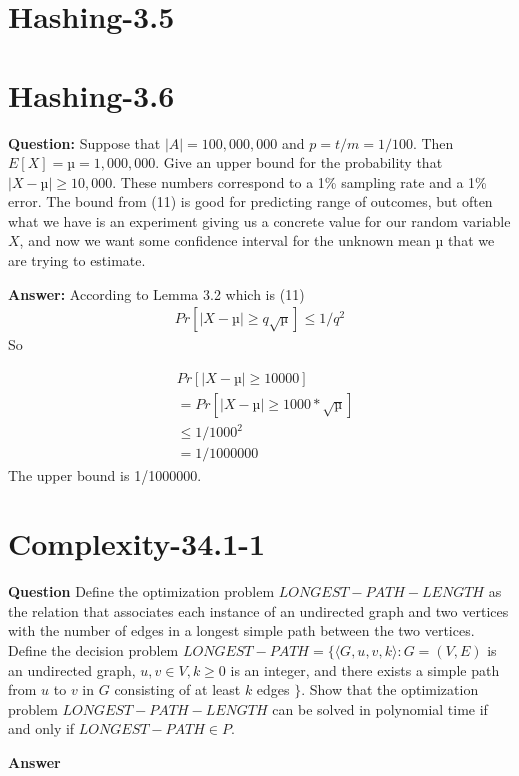 \documentclass[12pt]{article}
\begin{document}
\section{Hashing-3.5}

\section{Hashing-3.6}
\textbf{Question:}
Suppose that $|A| = 100,000,000$ and $p = t/m = 1/100$. Then $E[X] = µ = 1,000,000$. Give an upper bound for the probability that $|X - µ| \geq 10,000$. These numbers correspond to a 1\% sampling rate and a 1\% error. 
The bound from (11) is good for predicting range of outcomes, but often what we have is an experiment giving us a concrete value for our random variable $X$, and now we want some confidence interval for the unknown mean $µ$ that we are trying to estimate.

\textbf{Answer:}
According to Lemma 3.2 which is (11)
\begin{align}
    Pr[|X - µ| \geq q\sqrt{µ}] \leq 1 / q^2
\end{align}
So 

\begin{equation}
\begin{aligned}
    &Pr[|X - µ| \geq 10000]\\
    &=  Pr[|X - µ| \geq 1000 *\sqrt{µ}]\\
    & \leq 1/1000^2\\
    &= 1/1000000
\end{aligned}
\end{equation}
The upper bound is 1/1000000.

\section{Complexity-34.1-1}
\textbf{Question}
Define the optimization problem $LONGEST-PATH-LENGTH$ as the relation that associates each instance of an undirected graph and two vertices with the number of edges in a longest simple path between the two vertices. Define the decision problem $LONGEST-PATH= \{\langle G, u, v, k\rangle: G = (V, E)$ is an undirected graph, $u, v \in V, k \ge 0$ is an integer, and there exists a simple path from $u$ to $v$ in $G$ consisting of at least $k$ edges $\}$. Show that the optimization problem $LONGEST-PATH-LENGTH$ can be solved in polynomial time if and only if $LONGEST-PATH \in P$.

\textbf{Answer}
\end{document}
